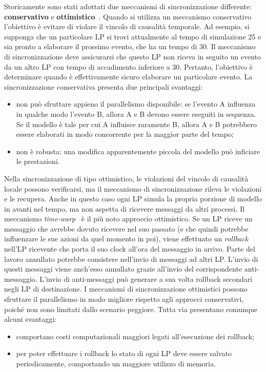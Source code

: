 \documentclass[12pt,a4paper,openright,twoside]{book}
\begin{document}
Storicamente sono stati adottati due meccanismi di sincronizzazione differente: \textbf{conservativo} e \textbf{ottimistico}~\cite{DBLP:conf/wsc/Fujimoto95}.
Quando si utilizza un meccanismo conservativo l'obiettivo è evitare di violare il vincolo di causalità temporale. Ad esempio, si supponga che un particolare LP si trovi attualmente al tempo di simulazione 25 e sia pronto a elaborare il prossimo evento, che ha un tempo di 30. Il meccanismo di sincronizzazione deve assicurarsi che questo LP non riceva in seguito un evento da un altro LP con tempo di accadimento inferiore a 30. Pertanto, l'obiettivo è determinare quando è effettivamente sicuro elaborare un particolare evento. 
La sincronizzazione conservativa presenta due principali svantaggi: 
\begin{itemize}
    \item non può sfruttare appieno il parallelismo disponibile: se l'evento A influenza in qualche modo l'evento B, allora A e B devono essere eseguiti in sequenza. Se il modello è tale per cui A influisce raramente B, allora A e B potrebbero essere elaborati in modo concorrente per la maggior parte del tempo;
    \item non è robusta: una modifica apparentemente piccola del modello può inficiare le prestazioni. 
\end{itemize}
Nella sincronizzazione di tipo ottimistico, le violazioni del vincolo di causalità locale possono verificarsi, ma il meccanismo di sincronizzazione rileva le violazioni e le recupera. Anche in questo caso ogni LP simula la propria porzione di modello in avanti nel tempo, ma non aspetta di ricevere messaggi da altri processi. 
Il meccanismo \textit{time-warp}~\cite{DBLP:journals/toplas/Jefferson85} è il più noto approccio ottimistico. Se un LP riceve un messaggio che avrebbe dovuto ricevere nel suo passato (e che quindi potrebbe influenzare le sue azioni da quel momento in poi), viene effettuato un \textit{rollback} nell'LP ricevente che porta il suo clock all'ora del messaggio in arrivo.
Parte del lavoro annullato potrebbe consistere nell'invio di messaggi ad altri LP. L'invio di questi messaggi viene anch'esso annullato grazie all'invio del corrispondente anti-messaggio. L'invio di anti-messaggi può generare a sua volta rollback secondari negli LP di destinazione.
I meccanismi di sincronizzazione ottimistici possono sfruttare il parallelismo in modo migliore rispetto agli approcci conservativi, poiché non sono limitati dallo scenario peggiore. Tutta via presentano comunque alcuni svantaggi: 
\begin{itemize}
    \item comportano costi computazionali maggiori legati all'esecuzione dei rollback; 
    \item per poter effettuare i rollback lo stato di ogni LP deve essere salvato periodicamente, comportando un maggiore utilizzo di memoria.
\end{itemize}
\end{document}
